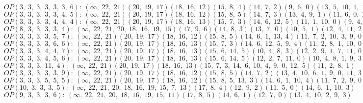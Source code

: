 $OP(3, \;3, \;3, \;3, \;3, \;3, \;6): \:(\infty, \;22, \;21)(20, \;19, \;17)(18, \;16, \;12)(15, \;8, \;4)(14, \;7, \;2)(9, \;6, \;0)(13, \;5, \;10, \;1, \;11, \;3)$\\
$OP(3, \;3, \;3, \;3, \;3, \;4, \;5): \:(\infty, \;22, \;21)(20, \;19, \;17)(18, \;16, \;12)(15, \;8, \;5)(14, \;7, \;3)(13, \;4, \;9, \;1)(11, \;6, \;0, \;10, \;2)$\\
$OP(3, \;3, \;3, \;3, \;4, \;4, \;4): \:(\infty, \;22, \;21)(20, \;19, \;17)(18, \;16, \;13)(15, \;7, \;3)(14, \;6, \;12, \;5)(11, \;1, \;10, \;0)(9, \;4, \;8, \;2)$\\
$OP(8, \;3, \;3, \;3, \;3, \;4): \:(\infty, \;22, \;21, \;20, \;18, \;16, \;19, \;15)(17, \;9, \;6)(14, \;8, \;3)(13, \;7, \;0)(10, \;5, \;1)(12, \;4, \;11, \;2)$\\
$OP(3, \;3, \;3, \;3, \;5, \;7): \:(\infty, \;22, \;21)(20, \;19, \;17)(18, \;16, \;12)(15, \;8, \;5)(14, \;6, \;1, \;13, \;4)(11, \;7, \;2, \;10, \;3, \;9, \;0)$\\
$OP(3, \;3, \;3, \;3, \;6, \;6): \:(\infty, \;22, \;21)(20, \;19, \;17)(18, \;16, \;13)(15, \;7, \;3)(14, \;6, \;12, \;5, \;9, \;4)(11, \;2, \;8, \;1, \;10, \;0)$\\
$OP(3, \;3, \;3, \;4, \;4, \;7): \:(\infty, \;22, \;21)(20, \;19, \;17)(18, \;16, \;13)(15, \;6, \;14, \;5)(10, \;4, \;8, \;3)(12, \;2, \;9, \;1, \;7, \;11, \;0)$\\
$OP(3, \;3, \;3, \;4, \;5, \;6): \:(\infty, \;22, \;21)(20, \;19, \;17)(18, \;16, \;13)(15, \;6, \;14, \;5)(12, \;2, \;7, \;11, \;0)(10, \;4, \;8, \;1, \;9, \;3)$\\
$OP(3, \;3, \;3, \;11, \;4): \:(\infty, \;22, \;21)(20, \;19, \;17)(18, \;16, \;13)(15, \;7, \;3, \;14, \;6, \;10, \;4, \;9, \;0, \;12, \;5)(11, \;2, \;8, \;1)$\\
$OP(3, \;3, \;3, \;3, \;3, \;9): \:(\infty, \;22, \;21)(20, \;19, \;17)(18, \;16, \;12)(15, \;8, \;5)(14, \;7, \;2)(13, \;4, \;10, \;6, \;1, \;9, \;0, \;11, \;3)$\\
$OP(3, \;3, \;3, \;5, \;5, \;5): \:(\infty, \;22, \;21)(20, \;19, \;17)(18, \;16, \;12)(15, \;8, \;5, \;13, \;3)(14, \;6, \;1, \;10, \;4)(11, \;7, \;2, \;9, \;0)$\\
$OP(10, \;3, \;3, \;3, \;5): \:(\infty, \;22, \;21, \;20, \;18, \;16, \;19, \;15, \;7, \;13)(17, \;8, \;4)(12, \;9, \;2)(11, \;5, \;0)(14, \;6, \;1, \;10, \;3)$\\
$OP(9, \;3, \;3, \;3, \;6): \:(\infty, \;22, \;21, \;20, \;18, \;16, \;19, \;15, \;11)(17, \;8, \;5)(14, \;6, \;1)(12, \;7, \;0)(13, \;4, \;10, \;2, \;9, \;3)$\\
